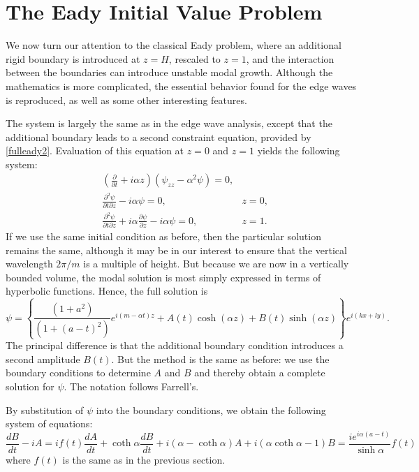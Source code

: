 \documentclass[letterpaper,11pt,onecolumn,twoside,titlepage]{article}
\newcommand{\pdiff}[2]{\frac{\partial #1}{\partial #2}}
\begin{document}

\section{The Eady Initial Value Problem}

We now turn our attention to the classical Eady problem, where an additional rigid boundary is introduced at $z=H$, rescaled to $z=1$, and the interaction between the boundaries can introduce unstable modal growth. Although the mathematics is more complicated, the essential behavior found for the edge waves is reproduced, as well as some other interesting features.

The system is largely the same as in the edge wave analysis, except that the additional boundary leads to a second constraint equation, provided by \eqref{fulleady2}. Evaluation of this equation at $z=0$ and $z=1$ yields the following system:
\begin{subequations}
\begin{align}
&\left(\pdiff{}{t} + i\alpha z\right) (\psi_{zz} - \alpha^2 \psi) = 0,& \\
&\frac{\partial^2 \psi}{\partial t \partial z} - i \alpha \psi = 0,& z = 0,\\
&\frac{\partial^2 \psi}{\partial t \partial z} + i \alpha \pdiff{\psi}{z} - i \alpha \psi = 0,& z = 1.
\end{align}
\end{subequations}
If we use the same initial condition as before, then the particular solution remains the same, although it may be in our interest to ensure that the vertical wavelength $2\pi/m$ is a multiple of height. But because we are now in a vertically bounded volume, the modal solution is most simply expressed in terms of hyperbolic functions. Hence, the full solution is 
\begin{equation}
\psi = \left\{\frac{(1+a^2)}{(1+(a-t)^2)} e^{i(m-\alpha t)z} + A(t) \cosh(\alpha z) + B(t) \sinh(\alpha z) \right\} e^{i(kx+ly)}.
\end{equation}
The principal difference is that the additional boundary condition introduces a second amplitude $B(t)$. But the method is the same as before: we use the boundary conditions to determine $A$ and $B$ and thereby obtain a complete solution for $\psi$. The notation follows Farrell's.

By substitution of $\psi$ into the boundary conditions, we obtain the following system of equations:
\begin{subequations}\label{eadyivp_sys}
\begin{equation}
\frac{dB}{dt} - iA = if(t)
\end{equation}
\begin{equation}
\frac{dA}{dt} + \coth \alpha \frac{dB}{dt} + i(\alpha - \coth \alpha) A + i(\alpha \coth \alpha - 1) B = \frac{i e^{i\alpha(a-t)}}{\sinh \alpha} f(t)
\end{equation}
\end{subequations}
where $f(t)$ is the same as in the previous section.
\end{document}
